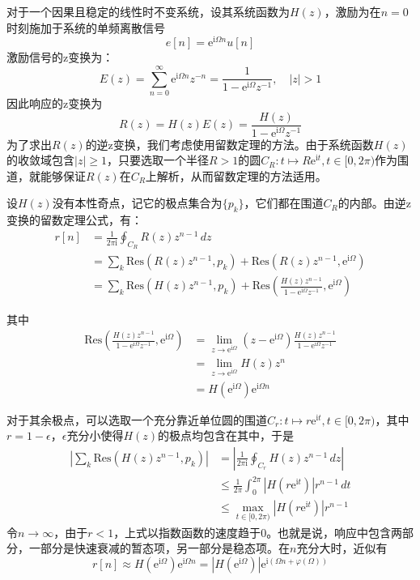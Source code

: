 \begin{example}
    对于一个因果且稳定的线性时不变系统，设其系统函数为$H(z)$，激励为在$n=0$时刻施加于系统的单频离散信号
    $$e[n]=\mathrm{e}^{\mathrm{i}\Omega n}u[n]$$
    激励信号的z变换为：
    $$E(z)=\sum_{n=0}^{\infty}\mathrm{e}^{\mathrm{i}\Omega n}z^{-n}=\frac{1}{1-\mathrm{e}^{\mathrm{i}\Omega}z^{-1}},\quad |z|>1$$
    因此响应的z变换为
    $$R(z)=H(z)E(z)=\frac{H(z)}{1-\mathrm{e}^{\mathrm{i}\Omega}z^{-1}}$$
    为了求出$R(z)$的逆z变换，我们考虑使用留数定理的方法。由于系统函数$H(z)$的收敛域包含$|z|\geq 1$，只要选取一个半径$R>1$的圆$C_R:t\mapsto R\mathrm{e}^{\mathrm{i}t},t\in[0,2\pi)$作为围道，就能够保证$R(z)$在$C_R$上解析，从而留数定理的方法适用。

    设$H(z)$没有本性奇点，记它的极点集合为$\{p_k\}$，它们都在围道$C_R$的内部。由逆z变换的留数定理公式，有：\begin{align*}
        r[n]&=\frac{1}{2\pi\mathrm{i}}\oint_{C_R}R(z)z^{n-1}\,dz\\
        &=\sum_{k}\text{Res}(R(z)z^{n-1},p_k)+\text{Res}(R(z)z^{n-1},\mathrm{e}^{\mathrm{i}\Omega})\\
        &=\sum_{k}\text{Res}(H(z)z^{n-1},p_k)+\text{Res}\left(\frac{H(z)z^{n-1}}{1-\mathrm{e}^{\mathrm{i}\Omega}z^{-1}},\mathrm{e}^{\mathrm{i}\Omega}\right)
    \end{align*}

    其中\begin{align*}
        \text{Res}\left(\frac{H(z)z^{n-1}}{1-\mathrm{e}^{\mathrm{i}\Omega}z^{-1}},\mathrm{e}^{\mathrm{i}\Omega}\right)&=\lim_{z\to \mathrm{e}^{\mathrm{i}\Omega}}(z-\mathrm{e}^{\mathrm{i}\Omega})\frac{H(z)z^{n-1}}{1-\mathrm{e}^{\mathrm{i}\Omega}z^{-1}}\\
        &=\lim_{z\to \mathrm{e}^{\mathrm{i}\Omega}}H(z)z^n\\
        &=H(\mathrm{e}^{\mathrm{i}\Omega})\mathrm{e}^{\mathrm{i}\Omega n}
    \end{align*}

    对于其余极点，可以选取一个充分靠近单位圆的围道$C_r:t\mapsto r\mathrm{e}^{\mathrm{i}t},t\in[0,2\pi)$，其中$r=1-\epsilon$，$\epsilon$充分小使得$H(z)$的极点均包含在其中，于是\begin{align*}
        \left|\sum_{k}\text{Res}(H(z)z^{n-1},p_k)\right|&=\left|\frac{1}{2\pi\mathrm{i}}\oint_{C_r}H(z)z^{n-1}\,dz\right|\\
        &\leq \frac{1}{2\pi}\int_{0}^{2\pi}|H(r\mathrm{e}^{\mathrm{i}t})|r^{n-1}\,dt\\
        &\leq \max_{t\in[0,2\pi)}|H(r\mathrm{e}^{\mathrm{i}t})|r^{n-1}
    \end{align*}
    令$n\to\infty$，由于$r<1$，上式以指数函数的速度趋于$0$。也就是说，响应中包含两部分，一部分是快速衰减的暂态项，另一部分是稳态项。在$n$充分大时，近似有
    $$r[n]\approx H(\mathrm{e}^{\mathrm{i}\Omega})\mathrm{e}^{\mathrm{i}\Omega n}=|H(\mathrm{e}^{\mathrm{i}\Omega})|\mathrm{e}^{\mathrm{i}(\Omega n+\varphi(\Omega))}$$


\end{example}
